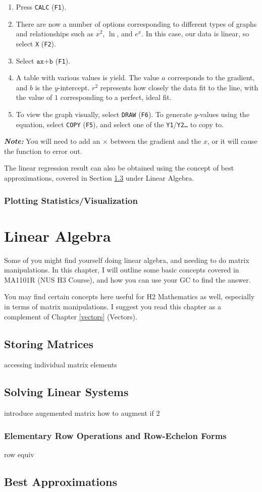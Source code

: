 \documentclass[a5paper,draft]{memoir}
\def\code#1{\texttt{#1}}
\def\note#1{\textbf{\textit{Note:}} #1}
\begin{document}
\begin{enumerate}
	\item Press \code{CALC} (\code{F1}).
	\item There are now a number of options corresponding to different types of graphs and relationships such as $x^2$, $\ln$, and $e^x$. In this case, our data is linear, so select \code{X} (\code{F2}).
	\item Select $\code{ax+b}$ (\code{F1}).
	\item A table with various values is yield. The value $a$ corresponds to the gradient, and $b$ is the $y$-intercept. $r^2$ represents how closely the data fit to the line, with the value of $1$ corresponding to a perfect, ideal fit.
	\item To view the graph visually, select \code{DRAW} (\code{F6}). To generate $y$-values using the equation, select \code{COPY} (\code{F5}), and select one of the \code{Y1}/\code{Y2\dots} to copy to.
\end{enumerate}

\note{You will need to add an $\times$ between the gradient and the $x$, or it will cause the function to error out.}

The linear regression result can also be obtained using the concept of best approximations, covered in Section \ref{bestapprox} under Linear Algebra.

\subsection{Plotting Statistics/Visualization} \label{plotstat}


\chapter{Linear Algebra}
Some of you might find yourself doing linear algebra, and needing to do matrix manipulations. In this chapter, I will outline some basic concepts covered in MA1101R (NUS H3 Course), and how you can use your GC to find the answer.

You may find certain concepts here useful for H2 Mathematics as well, especially in terms of matrix manipulations. I suggest you read this chapter as a complement of Chapter \ref{vectors} (Vectors). 

\section{Storing Matrices}
accessing individual matrix elements

\section{Solving Linear Systems} \label{solvLinSys}
introduce augemented matrix
how to augment if 2

\subsection{Elementary Row Operations and Row-Echelon Forms}
row equiv

\section{Best Approximations} \label{bestapprox}

\printindex
\end{document}
